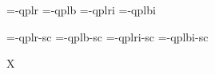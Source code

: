 

\ifx\sizespec\undefined \def\sizespec{}\fi
\ifx\font\corkencoded {}\else {}\fi

\ifx\font\unicoded  {} 
\else

\font\tenrm=\tmp-qplr  \sizespec
\font\tenbf=\tmp-qplb  \sizespec
\font\tenit=\tmp-qplri \sizespec
\font\tenbi=\tmp-qplbi \sizespec

\font\tenrmc=\tmp-qplr-sc  \sizespec
\font\tenbfc=\tmp-qplb-sc  \sizespec
\font\tenitc=\tmp-qplri-sc \sizespec
\font\tenbic=\tmp-qplbi-sc \sizespec

\fi

\tenrm

\def\caps#1{{\escapechar=-1 \expandafter}%
  \expandafter\csname\expandafter\tenonlytext\string#1c\endcsname}
\def\tenonlytext{ten}

\ifx\font\corkencoded\else \ifx\font\unicoded\else  \fi\fi
\ifx\mathpreloaded X\else  \fi                     



